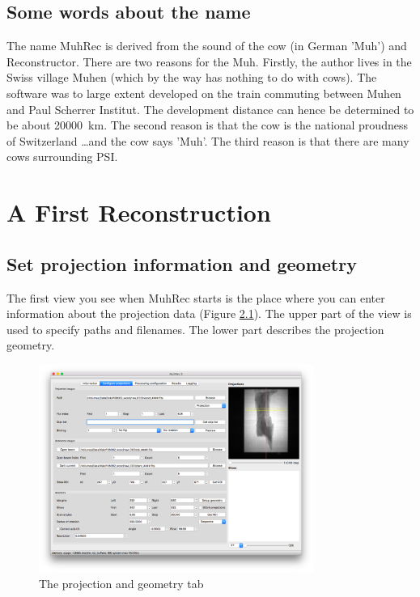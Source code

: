 \documentclass[a4paper]{scrreprt}
\begin{document}
\section{Some words about the name}
The name MuhRec is derived from the sound of the cow (in German 'Muh') and Reconstructor. There are two reasons for the Muh. Firstly, the author lives in the Swiss village Muhen (which by the way has nothing to do with cows). The software was to large extent developed on the train commuting between Muhen and Paul Scherrer Institut. The development distance can hence be determined to be about 20000~km. The second reason is that the cow is the national proudness of Switzerland \ldots and the cow says 'Muh'. The third reason is that there are many cows surrounding PSI.

\chapter{A First Reconstruction}

\section{Set projection information and geometry}
The first view you see when MuhRec starts is the place where you can enter information about the projection data (Figure \ref{fig_ProjectionGeometry}). The upper part of the view is used to specify paths and filenames. The lower part describes the projection geometry.  
\begin{figure}[ht!]
\centering
 \includegraphics[width=0.8\textwidth]{figures3/Main_DataAndGeometry.png}
\caption{The projection and geometry tab}\label{fig_ProjectionGeometry}
\end{figure}
\end{document}
